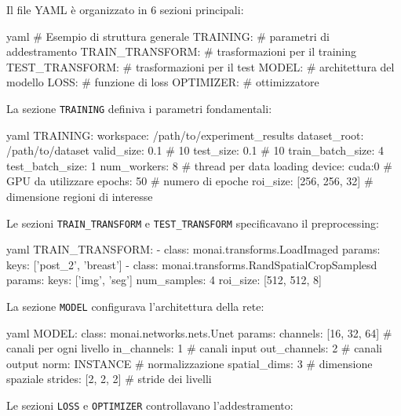 Il file YAML è organizzato in 6 sezioni principali:

\begin{code}{yaml}
# Esempio di struttura generale
TRAINING:
  # parametri di addestramento
TRAIN_TRANSFORM:
  # trasformazioni per il training
TEST_TRANSFORM:
  # trasformazioni per il test
MODEL:
  # architettura del modello
LOSS:
  # funzione di loss
OPTIMIZER:
  # ottimizzatore
\end{code}

La sezione \texttt{TRAINING} definiva i parametri fondamentali:

\begin{code}{yaml}
TRAINING:
  workspace: /path/to/experiment_results
  dataset_root: /path/to/dataset
  valid_size: 0.1  # 10%
  test_size: 0.1   # 10%
  train_batch_size: 4
  test_batch_size: 1 
  num_workers: 8    # thread per data loading
  device: cuda:0    # GPU da utilizzare
  epochs: 50        # numero di epoche
  roi_size: [256, 256, 32]  # dimensione regioni di interesse
\end{code}


Le sezioni \texttt{TRAIN\_TRANSFORM} e \texttt{TEST\_TRANSFORM} specificavano il preprocessing:

\begin{code}{yaml}
TRAIN_TRANSFORM:
  - class: monai.transforms.LoadImaged
    params:
      keys: ['post_2', 'breast']
  - class: monai.transforms.RandSpatialCropSamplesd
    params:
      keys: ['img', 'seg']
      num_samples: 4
      roi_size: [512, 512, 8]
\end{code}


La sezione \texttt{MODEL} configurava l'architettura della rete:

\begin{code}{yaml}
MODEL:
  class: monai.networks.nets.Unet
  params:
    channels: [16, 32, 64]  # canali per ogni livello
    in_channels: 1          # canali input
    out_channels: 2         # canali output
    norm: INSTANCE          # normalizzazione
    spatial_dims: 3         # dimensione spaziale
    strides: [2, 2, 2]      # stride dei livelli
\end{code}


Le sezioni \texttt{LOSS} e \texttt{OPTIMIZER} controllavano l'addestramento:


